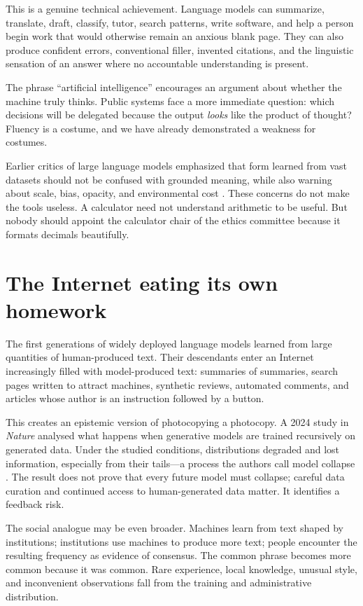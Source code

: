 \documentclass[12pt,a4paper]{book}
\begin{document}
This is a genuine technical achievement.  Language models can summarize,
translate, draft, classify, tutor, search patterns, write software, and help a
person begin work that would otherwise remain an anxious blank page.  They can
also produce confident errors, conventional filler, invented citations, and
the linguistic sensation of an answer where no accountable understanding is
present.

The phrase ``artificial intelligence'' encourages an argument about whether
the machine truly thinks.  Public systems face a more immediate question:
which decisions will be delegated because the output \emph{looks} like the
product of thought?  Fluency is a costume, and we have already demonstrated a
weakness for costumes.

Earlier critics of large language models emphasized that form learned from
vast datasets should not be confused with grounded meaning, while also warning
about scale, bias, opacity, and environmental cost
\cite{BenderStochasticParrots2021}.  These concerns do not make the tools
useless.  A calculator need not understand arithmetic to be useful.  But nobody
should appoint the calculator chair of the ethics committee because it formats
decimals beautifully.

\section{The Internet eating its own homework}

The first generations of widely deployed language models learned from large
quantities of human-produced text.  Their descendants enter an Internet
increasingly filled with model-produced text: summaries of summaries, search
pages written to attract machines, synthetic reviews, automated comments, and
articles whose author is an instruction followed by a button.

This creates an epistemic version of photocopying a photocopy.  A 2024 study in
\emph{Nature} analysed what happens when generative models are trained
recursively on generated data.  Under the studied conditions, distributions
degraded and lost information, especially from their tails---a process the
authors call model collapse \cite{ShumailovModelCollapse2024}.  The result does
not prove that every future model must collapse; careful data curation and
continued access to human-generated data matter.  It identifies a feedback
risk.

The social analogue may be even broader.  Machines learn from text shaped by
institutions; institutions use machines to produce more text; people encounter
the resulting frequency as evidence of consensus.  The common phrase becomes
more common because it was common.  Rare experience, local knowledge, unusual
style, and inconvenient observations fall from the training and administrative
distribution.
\end{document}
